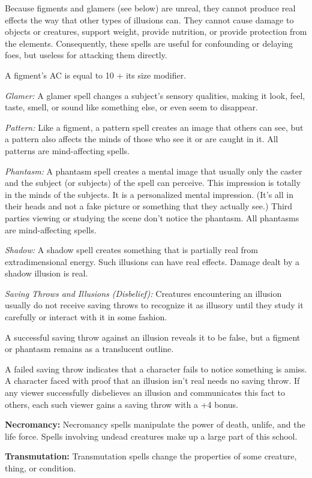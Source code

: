 Because figments and glamers (see below) are unreal, they cannot produce real effects the way that other types of illusions can. They cannot cause damage to objects or creatures, support weight, provide nutrition, or provide protection from the elements. Consequently, these spells are useful for confounding or delaying foes, but useless for attacking them directly.

A figment's AC is equal to 10 + its size modifier.

\textit{Glamer:} A glamer spell changes a subject's sensory qualities, making it look, feel, taste, smell, or sound like something else, or even seem to disappear.

\textit{Pattern:} Like a figment, a pattern spell creates an image that others can see, but a pattern also affects the minds of those who see it or are caught in it. All patterns are mind-affecting spells.

\textit{Phantasm:} A phantasm spell creates a mental image that usually only the caster and the subject (or subjects) of the spell can perceive. This impression is totally in the minds of the subjects. It is a personalized mental impression. (It's all in their heads and not a fake picture or something that they actually see.) Third parties viewing or studying the scene don't notice the phantasm. All phantasms are mind-affecting spells.

\textit{Shadow:} A shadow spell creates something that is partially real from extradimensional energy. Such illusions can have real effects. Damage dealt by a shadow illusion is real.

\textit{Saving Throws and Illusions (Disbelief):} Creatures encountering an illusion usually do not receive saving throws to recognize it as illusory until they study it carefully or interact with it in some fashion.

A successful saving throw against an illusion reveals it to be false, but a figment or phantasm remains as a translucent outline.

A failed saving throw indicates that a character fails to notice something is amiss. A character faced with proof that an illusion isn't real needs no saving throw. If any viewer successfully disbelieves an illusion and communicates this fact to others, each such viewer gains a saving throw with a +4 bonus.

\textbf{Necromancy:} Necromancy spells manipulate the power of death, unlife, and the life force. Spells involving undead creatures make up a large part of this school.

\textbf{Transmutation:} Transmutation spells change the properties of some creature, thing, or condition.
